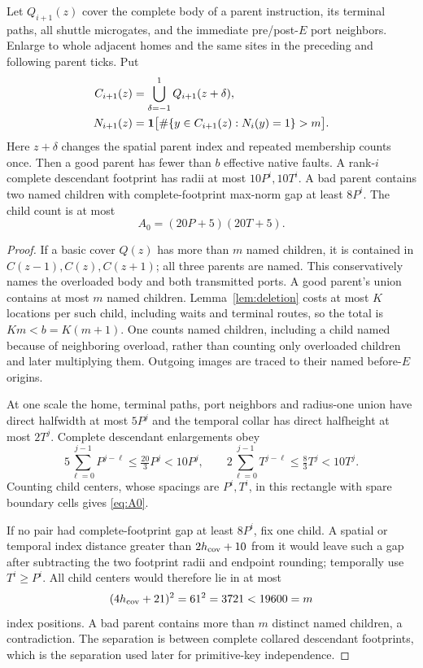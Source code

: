 \begin{samepage}
\begin{lemma}\label{lem:geometry}
Let $Q_{i+1}(z)$ cover the complete body of a parent instruction, its terminal paths, all shuttle microgates, and the immediate pre/post-$E$ port neighbors. Enlarge to whole adjacent homes and the same sites in the preceding and following parent ticks. Put
\begin{equation}\label{eq:naming}
 \begin{split}
 C_{i+1}(z)&=\bigcup_{\delta=-1}^1Q_{i+1}(z+\delta),\\
 N_{i+1}(z)&=\mathbf 1\bigl[\#\{y\in C_{i+1}(z):N_i(y)=1\}>m\bigr].
 \end{split}
\end{equation}
Here $z+\delta$ changes the spatial parent index and repeated membership counts once. Then a good parent has fewer than $b$ effective native faults. A rank-$i$ complete descendant footprint has radii at most $10P^i,10T^i$. A bad parent contains two named children with complete-footprint max-norm gap at least $8P^i$. The child count is at most
\begin{equation}\label{eq:A0}
 A_0=(20P+5)(20T+5).
\end{equation}
\end{lemma}
\end{samepage}
\begin{proof}
If a basic cover $Q(z)$ has more than $m$ named children, it is contained in $C(z-1),C(z),C(z+1)$; all three parents are named. This conservatively names the overloaded body and both transmitted ports. A good parent's union contains at most $m$ named children. Lemma~\ref{lem:deletion} costs at most $K$ locations per such child, including waits and terminal routes, so the total is $Km<b=K(m+1)$. One counts named children, including a child named because of neighboring overload, rather than counting only overloaded children and later multiplying them. Outgoing images are traced to their named before-$E$ origins.

At one scale the home, terminal paths, port neighbors and radius-one union have direct halfwidth at most $5P^j$ and the temporal collar has direct halfheight at most $2T^j$. Complete descendant enlargements obey
\[
 5\sum_{\ell=0}^{j-1}P^{j-\ell}\le\tfrac{20}{3}P^j<10P^j,
 \qquad
 2\sum_{\ell=0}^{j-1}T^{j-\ell}\le\tfrac83T^j<10T^j.
\]
Counting child centers, whose spacings are $P^i,T^i$, in this rectangle with spare boundary cells gives \eqref{eq:A0}.

If no pair had complete-footprint gap at least $8P^i$, fix one child. A spatial or temporal index distance greater than $2h_{\rm cov}+10$ from it would leave such a gap after subtracting the two footprint radii and endpoint rounding; temporally use $T^i\ge P^i$. All child centers would therefore lie in at most
\[
 (4h_{\rm cov}+21)^2=61^2=3721<19600=m
\]
index positions. A bad parent contains more than $m$ distinct named children, a contradiction. The separation is between complete collared descendant footprints, which is the separation used later for primitive-key independence.
\end{proof}

